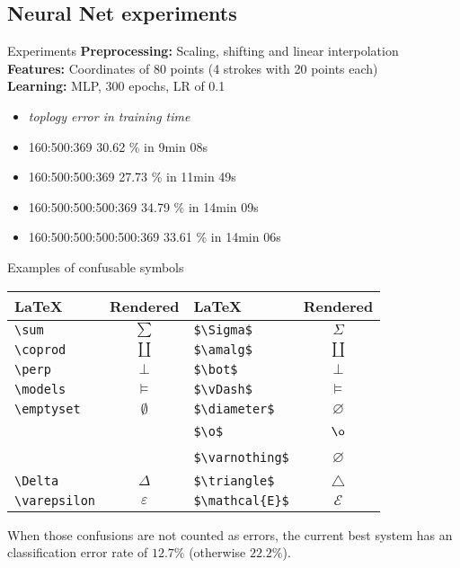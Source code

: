 \subsection{Neural Net experiments}
\begin{frame}{Experiments}
    \textbf{Preprocessing:} Scaling, shifting and linear interpolation\\
    \textbf{Features:} Coordinates of 80 points (4 strokes with 20 points each)\\
    \textbf{Learning:} MLP, 300 epochs, LR of 0.1
    \begin{itemize}
        \item[] \textit{toplogy       \tabto{6cm} error in training time}
        \item 160:500:369             \tabto{6cm} 30.62 \% in \hphantom{0}9min 08s
        \item 160:500:500:369         \tabto{6cm} 27.73 \% in 11min 49s
        \item 160:500:500:500:369     \tabto{6cm} 34.79 \% in 14min 09s
        \item 160:500:500:500:500:369 \tabto{6cm} 33.61 \% in 14min 06s
    \end{itemize}
\end{frame}

\begin{frame}[fragile]{Examples of confusable symbols}
\begin{table}[ht]
    \centering
    \begin{tabular}{lc|lc}
        \textbf{\LaTeX}& \textbf{Rendered}   & \textbf{\LaTeX}& \textbf{Rendered} \\\midrule
        \verb+\sum+    & $\sum$         & \verb+$\Sigma$+        & $\Sigma$\\
        \verb+\coprod+ & $\coprod$      & \verb+$\amalg$+        & $\amalg$\\
        \verb+\perp+   & $\perp$        & \verb+$\bot$+          & $\bot$\\
        \verb+\models+ & $\models$      & \verb+$\vDash$+        & $\vDash$\\
        \verb+\emptyset+ & $\emptyset$  & \verb+$\diameter$+     & $\diameter$\\
        ~              & ~              & \verb+$\o$+            & $\o$\\
        ~              & ~              & \verb+$\varnothing$+   & $\varnothing$\\
        \verb+\Delta+  & $\Delta$       & \verb+$\triangle$+     & $\triangle$\\
        \verb+\varepsilon+ & $\varepsilon$ & \verb+$\mathcal{E}$+ & $\mathcal{E}$\\
    \end{tabular}
\end{table}

When those confusions are not counted as errors, the current best system
has an classification error rate of $12.7 \%$ (otherwise $22.2 \%$).

\end{frame}